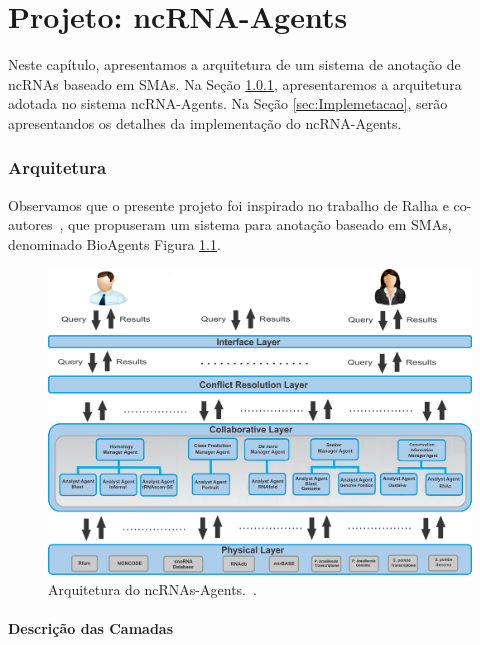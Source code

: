 \chapter{Projeto: ncRNA-Agents}
\label{sec:propostaNcRNAs}

Neste capítulo, apresentamos a arquitetura de um sistema de anota\c{c}\~ao de ncRNAs baseado em SMAs. Na Se\c{c}\~ao \ref{sec:ArqAnotacao}, apresentaremos a arquitetura adotada no sistema ncRNA-Agents. Na Se\c{c}\~ao \ref{sec:Implemetacao}, serão apresentandos os detalhes da implementa\c{c}\~ao do ncRNA-Agents.


\subsection{Arquitetura} \label{sec:ArqAnotacao}

Observamos que o presente projeto foi inspirado no trabalho de Ralha e 
co-autores~\citep{Schneider2006:2006,Ralha2011:2011}, que propuseram um sistema para anotação baseado em SMAs, denominado BioAgents Figura \ref{fig:441}.

\begin{landscape}
\begin{figure}[htb!]
\centering
\includegraphics[angle=0,width=1.4\textwidth]{imagens//Arquitetura2sem1.png}
\caption{Arquitetura do ncRNAs-Agents.~\citep{Arruda:2011}. 
\label{fig:441}}
\end{figure}
\end{landscape}


\subsubsection{Descri\c{c}\~ao das Camadas} \label{sec:DescriCamada}

